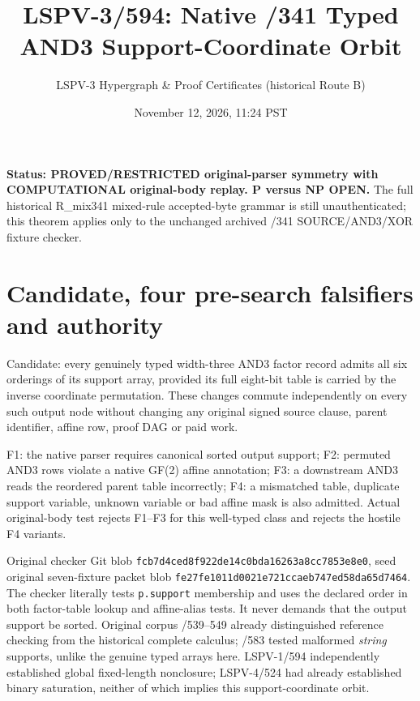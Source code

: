 \documentclass[11pt]{article}
\title{LSPV-3/594: Native /341 Typed AND3 Support-Coordinate Orbit}
\author{LSPV-3 Hypergraph \& Proof Certificates (historical Route B)}
\date{November 12, 2026, 11:24 PST}
\begin{document}
\maketitle
\noindent\textbf{Status: PROVED/RESTRICTED original-parser symmetry with COMPUTATIONAL original-body replay. P versus NP OPEN.}
The full historical R\_mix341 mixed-rule accepted-byte grammar is still unauthenticated; this theorem applies only to the unchanged archived /341 SOURCE/AND3/XOR fixture checker.

\section*{Candidate, four pre-search falsifiers and authority}
\noindent Candidate: every genuinely typed width-three AND3 factor record admits all six orderings of its support array, provided its full eight-bit table is carried by the inverse coordinate permutation. These changes commute independently on every such output node without changing any original signed source clause, parent identifier, affine row, proof DAG or paid work.

\noindent F1: the native parser requires canonical sorted output support; F2: permuted AND3 rows violate a native GF(2) affine annotation; F3: a downstream AND3 reads the reordered parent table incorrectly; F4: a mismatched table, duplicate support variable, unknown variable or bad affine mask is also admitted. Actual original-body test rejects F1--F3 for this well-typed class and rejects the hostile F4 variants.

\noindent Original checker Git blob \texttt{fcb7d4ced8f922de14c0bda16263a8cc7853e8e0}, seed original seven-fixture packet blob \texttt{fe27fe1011d0021e721ccaeb747ed58da65d7464}. The checker literally tests \texttt{p.support} membership and uses the declared order in both factor-table lookup and affine-alias tests. It never demands that the output support be sorted. Original corpus /539--549 already distinguished reference checking from the historical complete calculus; /583 tested malformed \emph{string} supports, unlike the genuine typed arrays here. LSPV-1/594 independently established global fixed-length nonclosure; LSPV-4/524 had already established binary saturation, neither of which implies this support-coordinate orbit.
\end{document}

